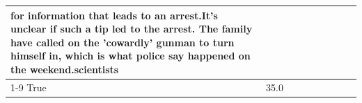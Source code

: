 \begin{table}[H]
\begin{tabular}{lllrlllll}
for information that leads to an arrest.It's unclear if such a tip led to the arrest. The family have called on the 'cowardly' gunman to turn himself in, which is what police say happened on the weekend.scientists \\
\cline{1-9}
True & 35.0%
\end{tabular}
\end{table}
